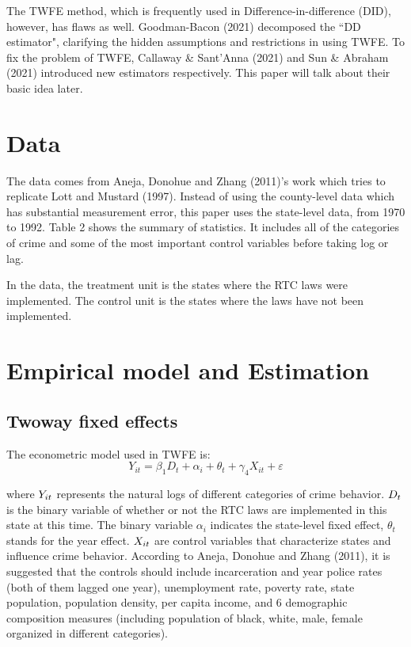 \documentclass{article}
\begin{document}
The TWFE method, which is frequently used in Difference-in-difference (DID), however, has flaws as well. Goodman-Bacon (2021) decomposed the ``DD estimator", clarifying the hidden assumptions and restrictions in using TWFE. To fix the problem of TWFE, Callaway \& Sant'Anna (2021) and Sun \& Abraham (2021) introduced new estimators respectively. This paper will talk about their basic idea later.

\section{Data}

The data comes from Aneja, Donohue and Zhang (2011)'s work which tries to replicate Lott and Mustard (1997). Instead of using the county-level data which has substantial measurement error, this paper uses the state-level data, from 1970 to 1992. Table 2 shows the summary of statistics. It includes all of the categories of crime and some of the most important control variables before taking log or lag.



In the data, the treatment unit is the states where the RTC laws were implemented. The control unit is the states where the laws have not been implemented.

\section{Empirical model and Estimation}

\subsection{Twoway fixed effects}

The econometric model used in TWFE is:
$$
    Y_{it} = \beta_1D_{t} + \alpha_i + \theta_t + \gamma_4X_{it} + \varepsilon
$$

where \( \mathnormal{Y_{it}} \) represents the natural logs of different categories of crime behavior. \( \mathnormal{D_{t}} \) is the binary variable of whether or not the RTC laws are implemented in this state at this time. The binary variable $\alpha_{i}$ indicates the state-level fixed effect, $\theta_{t}$ stands for the year effect. \( \mathnormal{X_{it}} \) are control variables that characterize states and influence crime behavior. According to Aneja, Donohue and Zhang (2011), it is suggested that the controls should include incarceration and year police rates (both of them lagged one year), unemployment rate, poverty rate, state population, population density, per capita income, and 6 demographic composition measures (including population of black, white, male, female organized in different categories). 
\end{document}
